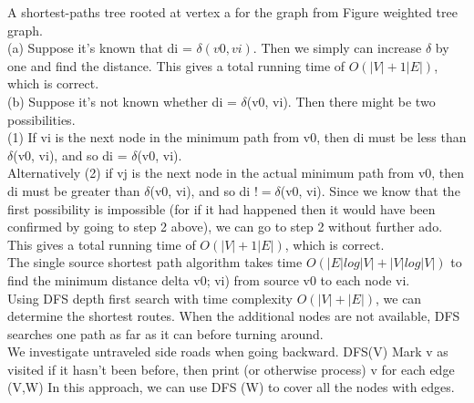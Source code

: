 \documentclass{article}
\begin{document}
\begin{enumerate}
A shortest-paths tree rooted at vertex a for the graph from Figure weighted tree graph.\\
(a) Suppose it's known that di = $\delta(v0, vi).$ Then we simply can increase $\delta$ by one and find the distance. This gives a total running time of $O(|V |+1|E|)$, which is correct.\\
(b) Suppose it's not known whether di = $\delta$(v0, vi). Then there might be two possibilities.\\
(1) If vi is the next node in the minimum path from v0, then di must be less than $\delta$(v0, vi), and so di = $\delta$(v0, vi).\\
Alternatively (2) if vj is the next node in the actual minimum path from v0, then di must be greater than $\delta$(v0, vi), and so di $!= \delta$(v0, vi). Since we know that the first possibility is impossible (for if it had happened then it would have been confirmed by going to step 2 above), we can go to step 2 without further ado. This gives a total running time of $O(|V |+1|E|)$, which is correct.\\

The single source shortest path algorithm takes time $O(|E|log|V|+|V|log|V|)$ to find the minimum distance delta v0; vi) from source v0 to each node vi. \\
Using DFS depth first search with time complexity $O(|V| + |E|)$, we can determine the shortest routes. When the additional nodes are not available, DFS searches one path as far as it can before turning around. \\
We investigate untraveled side roads when going backward. DFS(V) Mark v as visited if it hasn't been before, then print (or otherwise process) v for each edge (V,W) In this approach, we can use DFS (W) to cover all the nodes with edges.\\


\end{enumerate}
\end{document}
